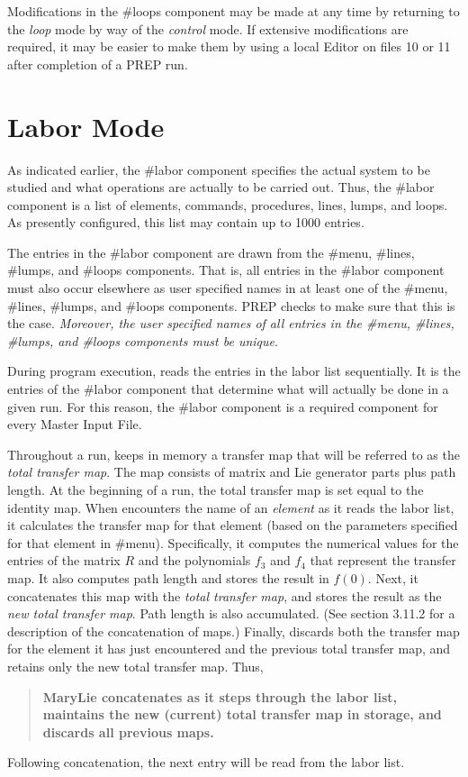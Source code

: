 Modifications in the \#loops component may be made at any time by returning
to the {\em loop} mode by way of the {\em control} mode. If extensive
modifications are required, it may be easier to make them by using a local
Editor on files 10 or 11 after completion of a PREP run.

\section{Labor Mode} As indicated earlier, the \#labor component specifies
the actual system to be studied and what operations are actually to be
carried out. Thus, the \#labor component is a list of elements, commands,
procedures, lines, lumps, and loops. As presently configured, this list may
contain up to 1000 entries.

The entries in the \#labor component are drawn from the \#menu, \#lines,
\#lumps, and \#loops components. That is, all entries in the \#labor
component must also occur elsewhere as user specified names in at least one
of the \#menu, \#lines, \#lumps, and \#loops components. PREP checks to
make sure that this is the case. {\em Moreover, the user specified names of
all entries in the \#menu, \#lines, \#lumps, and \#loops components must be
unique}.

During program execution, \Mary reads the entries in the labor list
sequentially. It is the entries of the \#labor component that determine
what will actually be done in a given \Mary run. For this reason, the
\#labor component is a required component for every Master Input File.

Throughout a run, \Mary keeps in memory a transfer map that will be
referred to as the {\em total transfer map}.  The map consists of matrix and
Lie generator parts plus path length. At the beginning of a run, the total
transfer map is set equal to the identity map. When \Mary encounters the
name of an {\em element} as it reads the labor list, it calculates the
transfer map for that element (based on the parameters specified for that
element in \#menu). Specifically, it computes the numerical values for the
entries of the matrix $R$ and the polynomials $f_3$ and $f_4$ that
represent the transfer map. It also computes path length and stores the
result in $f(0)$. Next, it concatenates this map with the {\em total
transfer map}, and stores the result as the {\em new total transfer map}.
Path length is also accumulated. (See section 3.11.2 for a description of
the concatenation of maps.) Finally, \Mary discards both the transfer map
for the element it has just encountered and the previous total transfer
map, and retains only the new total transfer map. Thus,
\begin{quote}
\bf MaryLie concatenates as it steps through the labor list, maintains the
new (current) total transfer map in storage, and discards all previous
maps.
\end{quote} Following concatenation, the next entry will be read from the
labor list.

